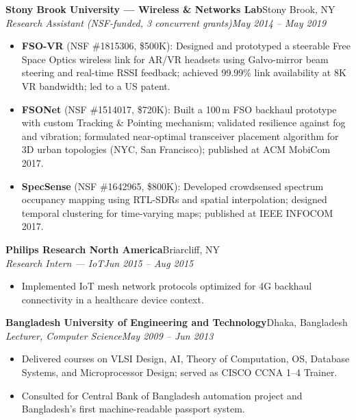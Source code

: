 \documentclass[10.5pt,letterpaper]{article}
\newcommand{\entrytitle}[2]{%
  \textbf{#1}\hfill #2%
}
\newcommand{\entrysub}[2]{%
  \textit{#1}\hfill \textit{#2}%
}
\begin{document}
\vspace{4pt}
\entrytitle{Stony Brook University --- Wireless \& Networks Lab}{Stony Brook, NY}\\
\entrysub{Research Assistant (NSF-funded, 3 concurrent grants)}{May 2014 -- May 2019}
\begin{itemize}
  \item \textbf{FSO-VR} (NSF \#1815306, \$500K): Designed and prototyped a steerable Free Space Optics
        wireless link for AR/VR headsets using Galvo-mirror beam steering and real-time RSSI feedback;
        achieved 99.99\% link availability at 8K VR bandwidth; led to a US patent.
  \item \textbf{FSONet} (NSF \#1514017, \$720K): Built a 100\,m FSO backhaul prototype with custom
        Tracking \& Pointing mechanism; validated resilience against fog and vibration; formulated
        near-optimal transceiver placement algorithm for 3D urban topologies (NYC, San Francisco);
        published at ACM MobiCom 2017.
  \item \textbf{SpecSense} (NSF \#1642965, \$800K): Developed crowdsensed spectrum occupancy mapping
        using RTL-SDRs and spatial interpolation; designed temporal clustering for time-varying maps;
        published at IEEE INFOCOM 2017.
\end{itemize}

\vspace{4pt}
\entrytitle{Philips Research North America}{Briarcliff, NY}\\
\entrysub{Research Intern --- IoT}{Jun 2015 -- Aug 2015}
\begin{itemize}
  \item Implemented IoT mesh network protocols optimized for 4G backhaul connectivity in a healthcare
        device context.
\end{itemize}

\vspace{4pt}
\entrytitle{Bangladesh University of Engineering and Technology}{Dhaka, Bangladesh}\\
\entrysub{Lecturer, Computer Science}{May 2009 -- Jun 2013}
\begin{itemize}
  \item Delivered courses on VLSI Design, AI, Theory of Computation, OS, Database Systems, and
        Microprocessor Design; served as CISCO CCNA 1--4 Trainer.
  \item Consulted for Central Bank of Bangladesh automation project and Bangladesh's first
        machine-readable passport system.
\end{itemize}
\end{document}

